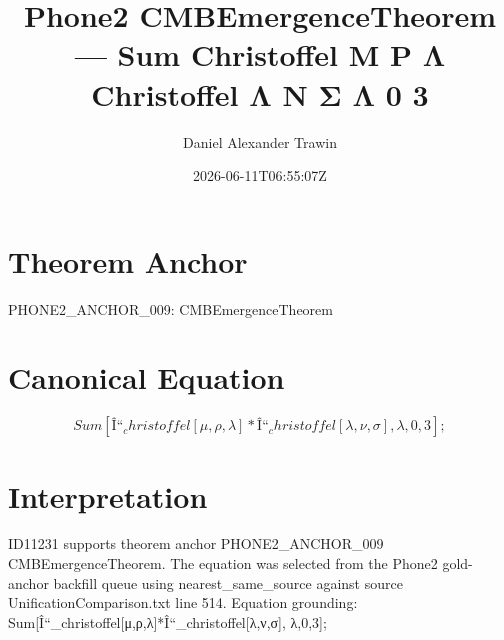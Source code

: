 \documentclass[11pt]{article}
\title{Phone2 CMBEmergenceTheorem — Sum Christoffel Μ Ρ Λ Christoffel Λ Ν Σ Λ 0 3}
\author{Daniel Alexander Trawin}
\date{2026-06-11T06:55:07Z}
\begin{document}
\maketitle
\section*{Theorem Anchor}
PHONE2_ANCHOR_009: CMBEmergenceTheorem
\section*{Canonical Equation}
\[
Sum[Î“_christoffel[μ,ρ,λ]*Î“_christoffel[λ,ν,σ], {λ,0,3}];
\]
\section*{Interpretation}
ID11231 supports theorem anchor PHONE2_ANCHOR_009 CMBEmergenceTheorem. The equation was selected from the Phone2 gold-anchor backfill queue using nearest_same_source against source UnificationComparison.txt line 514. Equation grounding: Sum[Î“_christoffel[μ,ρ,λ]*Î“_christoffel[λ,ν,σ], {λ,0,3}];
\end{document}
